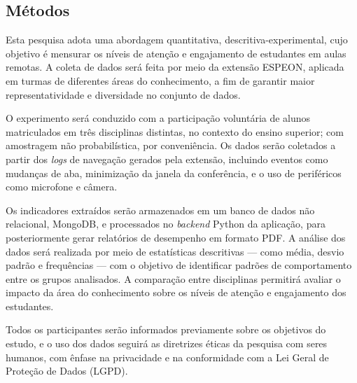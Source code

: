 \subsection{Métodos}\label{sec:methods}
Esta pesquisa adota uma abordagem quantitativa, descritiva-experimental, cujo objetivo é mensurar os níveis de atenção e engajamento de estudantes em aulas remotas. A coleta de dados será feita por meio da extensão ESPEON, aplicada em turmas de diferentes áreas do conhecimento, a fim de garantir maior representatividade e diversidade no conjunto de dados.

O experimento será conduzido com a participação voluntária de alunos matriculados em três disciplinas distintas, no contexto do ensino superior; com amostragem não probabilística, por conveniência. Os dados serão coletados a partir dos \textit{logs} de navegação gerados pela extensão, incluindo eventos como mudanças de aba, minimização da janela da conferência, e o uso de periféricos como microfone e câmera.

Os indicadores extraídos serão armazenados em um banco de dados não relacional, MongoDB, e processados no \textit{backend} Python da aplicação, para posteriormente gerar relatórios de desempenho em formato PDF. A análise dos dados será realizada por meio de estatísticas descritivas — como média, desvio padrão e frequências —  com o objetivo de identificar padrões de comportamento entre os grupos analisados. A comparação entre disciplinas permitirá avaliar o impacto da área do conhecimento sobre os níveis de atenção e engajamento dos estudantes.

Todos os participantes serão informados previamente sobre os objetivos do estudo, e o uso dos dados seguirá as diretrizes éticas da pesquisa com seres humanos, com ênfase na privacidade e na conformidade com a Lei Geral de Proteção de Dados (LGPD).
